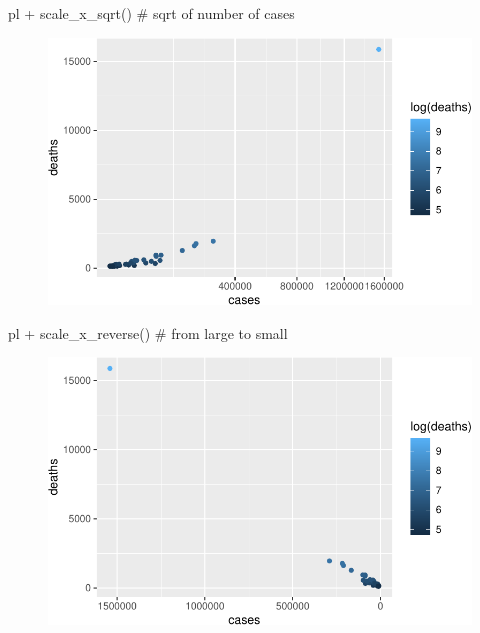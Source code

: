 \documentclass[
  letterpaper,
  DIV=11,
  numbers=noendperiod]{scrreprt}
\newenvironment{Shaded}{\begin{snugshade}}{\end{snugshade}}
\newcommand{\CommentTok}[1]{\textcolor[rgb]{0.37,0.37,0.37}{#1}}
\newcommand{\FunctionTok}[1]{\textcolor[rgb]{0.28,0.35,0.67}{#1}}
\newcommand{\NormalTok}[1]{\textcolor[rgb]{0.00,0.23,0.31}{#1}}
\newcommand{\SpecialCharTok}[1]{\textcolor[rgb]{0.37,0.37,0.37}{#1}}
\begin{document}
\begin{Shaded}
\begin{Highlighting}[]
\NormalTok{pl }\SpecialCharTok{+} \FunctionTok{scale\_x\_sqrt}\NormalTok{() }\CommentTok{\# sqrt of number of cases}
\end{Highlighting}
\end{Shaded}

\begin{figure}[H]

{\centering \includegraphics{./01-dataviz_files/figure-pdf/unnamed-chunk-19-2.pdf}

}

\end{figure}

\begin{Shaded}
\begin{Highlighting}[]
\NormalTok{pl }\SpecialCharTok{+} \FunctionTok{scale\_x\_reverse}\NormalTok{() }\CommentTok{\# from large to small}
\end{Highlighting}
\end{Shaded}

\begin{figure}[H]

{\centering \includegraphics{./01-dataviz_files/figure-pdf/unnamed-chunk-19-3.pdf}

}

\end{figure}
\end{document}
